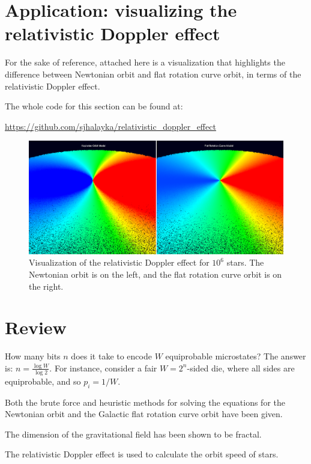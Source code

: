 \documentclass[12pt]{article}
\begin{document}
\section{Application: visualizing the relativistic Doppler effect}
For the sake of reference, attached here is a visualization that highlights the difference between Newtonian orbit and flat rotation curve orbit, in terms of the relativistic Doppler effect.

The whole code for this section can be found at:

\url{https://github.com/sjhalayka/relativistic_doppler_effect}

\begin{figure} 
\centering
\label{fig2}
  \includegraphics[width = 7 in]{doppler.png}
  \caption{
Visualization of the relativistic Doppler effect for $10^6$ stars.
The Newtonian orbit is on the left, and the flat rotation curve orbit is on the right.
}
\end{figure}




\section{Review}

How many bits $n$ does it take to encode $W$ equiprobable microstates?
The answer is: $n = \frac{\log W}{\log 2}$.
For instance, consider a fair $W = 2^n$-sided die, where all sides are equiprobable, and so $p_i = 1/W$.

Both the brute force and heuristic methods for solving the equations for the Newtonian orbit and the Galactic flat rotation curve orbit have been given.

The dimension of the gravitational field has been shown to be fractal.

The relativistic Doppler effect is used to calculate the orbit speed of stars.
\end{document}
